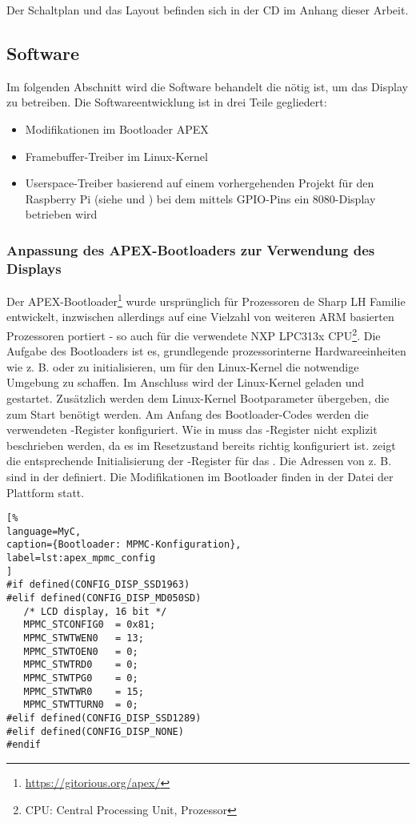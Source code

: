 Der Schaltplan und das Layout befinden sich in der CD im Anhang dieser Arbeit.
\newpage
\subsection{Software}
Im folgenden Abschnitt wird die Software behandelt die nötig ist, um das Display zu betreiben. 
Die Softwareentwicklung ist in drei Teile gegliedert:
\begin{itemize}
\item Modifikationen im Bootloader APEX
\item Framebuffer-Treiber im Linux-Kernel
\item Userspace-Treiber basierend auf einem vorhergehenden Projekt für den Raspberry Pi (siehe \cite{Schlegel2013a} und \cite{Schlegel2013b}) bei dem mittels GPIO-Pins ein 8080-Display betrieben wird
\end{itemize}

\subsubsection{Anpassung des APEX-Bootloaders zur Verwendung des Displays}
Der APEX-Bootloader\footnote{\url{https://gitorious.org/apex/}} wurde ursprünglich für Prozessoren de Sharp LH Familie entwickelt,  inzwischen allerdings auf eine Vielzahl von weiteren ARM basierten Prozessoren portiert - so auch für die verwendete NXP LPC313x CPU\footnote{CPU: Central Processing Unit, Prozessor}.
Die Aufgabe des Bootloaders ist es, grundlegende prozessorinterne Hardwareeinheiten wie z. B.  oder  zu initialisieren, um für den Linux-Kernel die notwendige Umgebung zu schaffen. Im Anschluss wird der Linux-Kernel geladen und gestartet. Zusätzlich werden dem Linux-Kernel Bootparameter übergeben, die zum Start benötigt werden. Am Anfang des Bootloader-Codes werden die verwendeten -Register konfiguriert. Wie in  muss das -Register  nicht explizit beschrieben werden, da es im Resetzustand bereits richtig konfiguriert ist.  zeigt die entsprechende Initialisierung der -Register für das . Die Adressen von z. B.  sind in der  definiert. Die Modifikationen im Bootloader finden in der Datei  der Plattform statt.

\begin{lstlisting}[%
language=MyC,
caption={Bootloader: MPMC-Konfiguration},
label=lst:apex_mpmc_config
]
#if defined(CONFIG_DISP_SSD1963)
#elif defined(CONFIG_DISP_MD050SD)
   /* LCD display, 16 bit */
   MPMC_STCONFIG0  = 0x81;
   MPMC_STWTWEN0   = 13;
   MPMC_STWTOEN0   = 0;
   MPMC_STWTRD0    = 0;
   MPMC_STWTPG0    = 0;
   MPMC_STWTWR0    = 15;
   MPMC_STWTTURN0  = 0;
#elif defined(CONFIG_DISP_SSD1289)
#elif defined(CONFIG_DISP_NONE)
#endif
\end{lstlisting}


